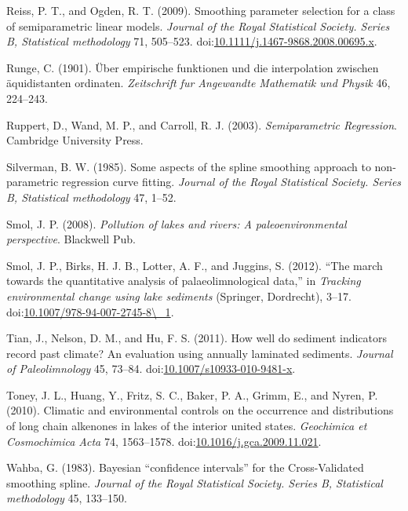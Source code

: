 \documentclass[12pt,]{article}
\begin{document}
\hypertarget{ref-Reiss2009-fk}{}
Reiss, P. T., and Ogden, R. T. (2009). Smoothing parameter selection for
a class of semiparametric linear models. \emph{Journal of the Royal
Statistical Society. Series B, Statistical methodology} 71, 505--523.
doi:\href{https://doi.org/10.1111/j.1467-9868.2008.00695.x}{10.1111/j.1467-9868.2008.00695.x}.

\hypertarget{ref-Runge1901-tc}{}
Runge, C. (1901). Über empirische funktionen und die interpolation
zwischen äquidistanten ordinaten. \emph{Zeitschrift fur Angewandte
Mathematik und Physik} 46, 224--243.

\hypertarget{ref-Ruppert2003-pt}{}
Ruppert, D., Wand, M. P., and Carroll, R. J. (2003).
\emph{Semiparametric Regression}. Cambridge University Press.

\hypertarget{ref-Silverman1985-kw}{}
Silverman, B. W. (1985). Some aspects of the spline smoothing approach
to non-parametric regression curve fitting. \emph{Journal of the Royal
Statistical Society. Series B, Statistical methodology} 47, 1--52.

\hypertarget{ref-Smol2008-ld}{}
Smol, J. P. (2008). \emph{Pollution of lakes and rivers: A
paleoenvironmental perspective}. Blackwell Pub.

\hypertarget{ref-Smol2012-xt}{}
Smol, J. P., Birks, H. J. B., Lotter, A. F., and Juggins, S. (2012).
``The march towards the quantitative analysis of palaeolimnological
data,'' in \emph{Tracking environmental change using lake sediments}
(Springer, Dordrecht), 3--17.
doi:\href{https://doi.org/10.1007/978-94-007-2745-8/_1}{10.1007/978-94-007-2745-8\textbackslash{}\_1}.

\hypertarget{ref-Tian2011-ip}{}
Tian, J., Nelson, D. M., and Hu, F. S. (2011). How well do sediment
indicators record past climate? An evaluation using annually laminated
sediments. \emph{Journal of Paleolimnology} 45, 73--84.
doi:\href{https://doi.org/10.1007/s10933-010-9481-x}{10.1007/s10933-010-9481-x}.

\hypertarget{ref-Toney2010-ba}{}
Toney, J. L., Huang, Y., Fritz, S. C., Baker, P. A., Grimm, E., and
Nyren, P. (2010). Climatic and environmental controls on the occurrence
and distributions of long chain alkenones in lakes of the interior
united states. \emph{Geochimica et Cosmochimica Acta} 74, 1563--1578.
doi:\href{https://doi.org/10.1016/j.gca.2009.11.021}{10.1016/j.gca.2009.11.021}.

\hypertarget{ref-Wahba1983-eh}{}
Wahba, G. (1983). Bayesian ``confidence intervals'' for the
Cross-Validated smoothing spline. \emph{Journal of the Royal Statistical
Society. Series B, Statistical methodology} 45, 133--150.
\end{document}
